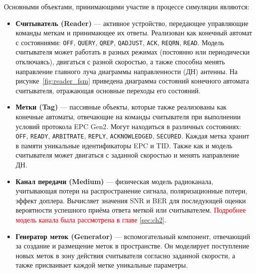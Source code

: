 \documentclass[12pt]{article}
\theoremstyle{definition}
\begin{document}
Основными объектами, принимающими участие в процессе симуляции являются:

\begin{itemize}
    \item \textbf{Считыватель (Reader)} --- активное устройство, передающее управляющие команды меткам и принимающее их ответы. Реализован как конечный автомат с состояниями: \texttt{OFF}, \texttt{QUERY}, \texttt{QREP}, \texttt{QADJUST}, \texttt{ACK}, \texttt{REQRN}, \texttt{READ}. Модель считывателя может работать в разных режимах (постоянно или периодически отключаясь), двигаться с разной скоростью, а также способна менять направление главного луча диаграммы направленности (ДН) антенны. На рисунке~\ref{fig:reader_fsm} приведена диаграмма состояний конечного автомата считывателя, отражающая основные переходы его состояний.
    
    \item \textbf{Метки (Tag)} --- пассивные объекты, которые также реализованы как конечные автоматы, отвечающие на команды считывателя при выполнении условий протокола EPC Gen2. Могут находиться в различных состояниях: \texttt{OFF}, \texttt{READY}, \texttt{ARBITRATE}, \texttt{REPLY}, \texttt{ACKNOWLEDGED}, \texttt{SECURED}. Каждая метка хранит в памяти уникальные идентификаторы EPC и TID. Также как и модель считывателя может двигаться с заданной скоростью и менять направление ДН.
    
    \item \textbf{Канал передачи (Medium)} --- физическая модель радиоканала, учитывающая потери на распространение сигнала, поляризационные потери, эффект доплера. Вычисляет значения SNR и BER для последующей оценки вероятности успешного приёма ответа меткой или считывателем. \textcolor{red}{Подробнее модель канала была рассмотрена в главе \ref{sec:ch2}}.
    
    \item \textbf{Генератор меток (Generator)} --- вспомогательный компонент, отвечающий за создание и размещение меток в пространстве. Он моделирует поступление новых меток в зону действия считывателя согласно заданной скорости, а также присваивает каждой метке уникальные параметры.
\end{itemize}
\end{document}
